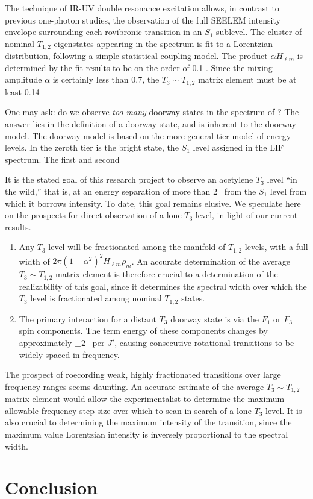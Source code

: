 \documentclass[12pt]{mitthesis}
\begin{document}
The technique of IR-UV double resonance excitation allows, in contrast
to previous one-photon studies, the observation of the full SEELEM
intensity envelope surrounding each rovibronic transition in an $S_1$
sublevel.  The cluster of nominal $T_{1,2}$ eigenstates appearing in
the spectrum is fit to a Lorentzian distribution, following a simple
statistical coupling model.  The product $\alpha H_{\ell m}$ is
determined by the fit results to be on the order of 0.1 \rcm.  Since
the mixing amplitude $\alpha$ is certainly less than 0.7, the $T_3 \sim
T_{1,2}$ matrix element must be at least 0.14

One may ask: do we observe \emph{too many} doorway states in the
spectrum of ?  The answer lies in the definition of a doorway
state, and is inherent to the doorway model.  The doorway model is
based on the more general tier model of energy levels.  In the zeroth
tier is the bright state, the $S_1$ level assigned in the LIF
spectrum.  The first and second


It is the stated goal of this research project to observe an acetylene
$T_3$ level ``in the wild,'' that is, at an energy separation of more
than 2 \rcm\ from the $S_1$ level from which it borrows intensity.  To
date, this goal remains elusive.  We speculate here on the prospects
for direct observation of a lone $T_3$ level, in light of our current results.
\begin{enumerate}
\item Any $T_3$ level will be fractionated among the manifold of
  $T_{1,2}$ levels, with a full width of $2 \pi (1-\alpha^2)^2 
  H_{\ell m} \rho_m$. An accurate determination of the average $T_3
  \sim T_{1,2}$ matrix element is therefore crucial to a determination
  of the realizability of this goal, since it determines the spectral
  width over which the $T_3$ level is fractionated among nominal
  $T_{1,2}$ states.
\item The primary interaction for a distant $T_3$ doorway state is via
  the $F_1$ or $F_3$ spin components.  The term energy of these
  components changes by approximately $\pm 2$ \rcm\ per $J'$, causing
  consecutive rotational transitions to be widely spaced in frequency.
\end{enumerate}
The prospect of roecording weak, highly fractionated transitions over
large frequency ranges seems daunting.  An accurate estimate
of the average $T_3 \sim T_{1,2}$ matrix element would allow the
experimentalist to determine the maximum allowable frequency step size over
which to scan in search of a lone $T_3$ level.  It is also crucial to
determining the maximum intensity of the transition, since the maximum
value Lorentzian intensity is inversely proportional to the spectral width.


\section{Conclusion}





\end{document}
